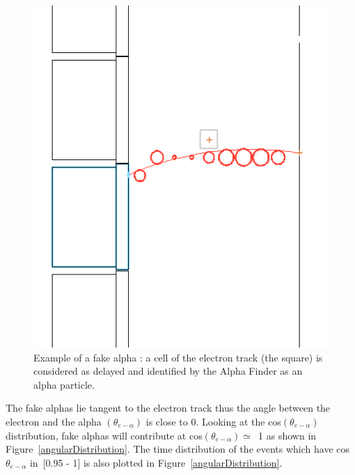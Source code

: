 \documentclass[main.tex]{subfiles}
\begin{document}
\begin{figure}[h!]
\begin{center}
\includegraphics[scale=0.4]{pictures/Chap5/fakeAlpha.png}
\caption{Example of a fake alpha : a cell of the electron track (the square) is considered as delayed and identified by the Alpha Finder as an alpha particle.}
\label{fakeAlpha}
\end{center}
\end{figure}


\bigskip


\noindent The fake alphas lie tangent to the electron track thus the angle between the electron and the alpha $(\theta_{e-\alpha})$ is close to 0. Looking at the cos$( \theta_{e-\alpha})$ distribution, fake alphas will contribute at cos$(\theta_{e-\alpha}) \simeq$~1 as shown in Figure~\ref{angularDistribution}. The time distribution of the events which have cos $\theta_{e-\alpha}$ in~[0.95 - 1] is also plotted in Figure~\ref{angularDistribution}.
\end{document}
